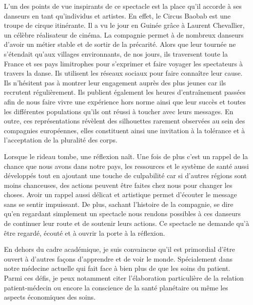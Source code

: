 L’un des points de vue inspirants de ce spectacle est la place qu’il accorde à ses danseurs en tant qu’individus et artistes. En effet, le Circus Baobab est une troupe de cirque itinérante. Il a vu le jour en Guinée grâce à Laurent Chevallier, un célèbre réalisateur de cinéma. La compagnie permet à de nombreux danseurs d’avoir un métier stable et de sortir de la précarité. Alors que leur tournée ne s’étendait qu’aux villages environnants, de nos jours, ils traversent toute la France et ses pays limitrophes pour s’exprimer et faire voyager les spectateurs à travers la danse. Ils utilisent les réseaux sociaux pour faire connaître leur cause. Ils n’hésitent pas à montrer leur engagement auprès des plus jeunes car ils recrutent régulièrement. Ils publient également les heures d’entraînement passées afin de nous faire vivre une expérience hors norme ainsi que leur succès et toutes les différentes populations qu’ils ont réussi à toucher avec leurs messages. En outre, ces représentations révèlent des silhouettes rarement observées au sein des compagnies européennes, elles constituent ainsi une invitation à la tolérance et à l'acceptation de la pluralité des corps.

Lorsque le rideau tombe, une réflexion naît. Une fois de plus c’est un rappel de la chance que nous avons dans notre pays, les ressources et le système de santé aussi développés tout en ajoutant une touche de culpabilité car si d’autres régions sont moins chanceuses, des actions peuvent être faites chez nous pour changer les choses. Avoir un rappel aussi délicat et artistique permet d’écouter le message sans se sentir impuissant. De plus, sachant l’histoire de la compagnie, se dire qu’en regardant simplement un spectacle nous rendons possibles à ces danseurs de continuer leur route et de soutenir leurs actions. Ce spectacle ne demande qu’à être regardé, écouté et à ouvrir la porte à la réflexion.

En dehors du cadre académique, je suis convaincue qu’il est primordial d’être ouvert à d’autres façons d’apprendre et de voir le monde. Spécialement dans notre médecine actuelle qui fait face à bien plus de  que les soins du patient. Parmi ces défis, je peux notamment citer l'élaboration particulière de la relation patient-médecin ou encore la conscience de la santé planétaire ou même les aspects économiques des soins.